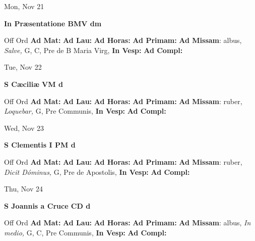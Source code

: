 \documentclass[10pt]{book}
\begin{document}
\begin{center}
\begin{minipage}{3.5in}
\vspace{2em}
\begin{center}Mon, Nov 21
\end{center}
\textbf{ \large In Præsentatione BMV
\textnormal{\normalsize dm}}

\begin{justify}Off Ord
\textbf{Ad Mat: }
\textbf{Ad Lau: }
\textbf{Ad Horas: }
\textbf{Ad Primam: }\textbf{Ad Missam}: albus, \textit{Salve,} G, C, Pre de B Maria Virg, 
\textbf{In Vesp: }
\textbf{Ad Compl: }
\end{justify}
\end{minipage}
\end{center}

\begin{center}
\begin{minipage}{3.5in}
\vspace{2em}
\begin{center}Tue, Nov 22
\end{center}
\textbf{ \large S Cæciliæ VM
\textnormal{\normalsize d}}

\begin{justify}Off Ord
\textbf{Ad Mat: }
\textbf{Ad Lau: }
\textbf{Ad Horas: }
\textbf{Ad Primam: }\textbf{Ad Missam}: ruber, \textit{Loquebar,} G, Pre Communis, 
\textbf{In Vesp: }
\textbf{Ad Compl: }
\end{justify}
\end{minipage}
\end{center}

\begin{center}
\begin{minipage}{3.5in}
\vspace{2em}
\begin{center}Wed, Nov 23
\end{center}
\textbf{ \large S Clementis I PM
\textnormal{\normalsize d}}

\begin{justify}Off Ord
\textbf{Ad Mat: }
\textbf{Ad Lau: }
\textbf{Ad Horas: }
\textbf{Ad Primam: }\textbf{Ad Missam}: ruber, \textit{Dicit Dóminus,} G, Pre de Apostolis, 
\textbf{In Vesp: }
\textbf{Ad Compl: }
\end{justify}
\end{minipage}
\end{center}

\begin{center}
\begin{minipage}{3.5in}
\vspace{2em}
\begin{center}Thu, Nov 24
\end{center}
\textbf{ \large S Joannis a Cruce CD
\textnormal{\normalsize d}}

\begin{justify}Off Ord
\textbf{Ad Mat: }
\textbf{Ad Lau: }
\textbf{Ad Horas: }
\textbf{Ad Primam: }\textbf{Ad Missam}: albus, \textit{In medio,} G, C, Pre Communis, 
\textbf{In Vesp: }
\textbf{Ad Compl: }
\end{justify}
\end{minipage}
\end{center}
\end{document}
